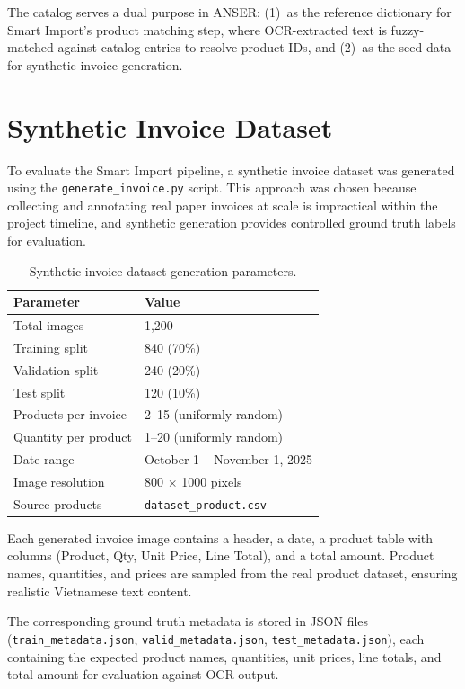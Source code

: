 \documentclass[11pt,a4paper]{report}
\begin{document}
The catalog serves a dual purpose in ANSER: (1)~as the reference dictionary for Smart Import's product matching step, where OCR-extracted text is fuzzy-matched against catalog entries to resolve product IDs, and (2)~as the seed data for synthetic invoice generation.

\section{Synthetic Invoice Dataset}

To evaluate the Smart Import pipeline, a synthetic invoice dataset was generated using the \texttt{generate\_invoice.py} script. This approach was chosen because collecting and annotating real paper invoices at scale is impractical within the project timeline, and synthetic generation provides controlled ground truth labels for evaluation.

\begin{table}[H]
\centering
\caption{Synthetic invoice dataset generation parameters.}
\label{tab:dataset-params}
\small
\begin{tabular}{ll}
\toprule
\textbf{Parameter} & \textbf{Value} \\
\midrule
Total images          & 1,200 \\
Training split        & 840 (70\%) \\
Validation split      & 240 (20\%) \\
Test split            & 120 (10\%) \\
Products per invoice  & 2--15 (uniformly random) \\
Quantity per product  & 1--20 (uniformly random) \\
Date range            & October 1 -- November 1, 2025 \\
Image resolution      & 800 $\times$ 1000 pixels \\
Source products       & \texttt{dataset\_product.csv} \\
\bottomrule
\end{tabular}
\end{table}

Each generated invoice image contains a header, a date, a product table with columns (Product, Qty, Unit Price, Line Total), and a total amount. Product names, quantities, and prices are sampled from the real product dataset, ensuring realistic Vietnamese text content.

The corresponding ground truth metadata is stored in JSON files (\texttt{train\_metadata.json}, \texttt{valid\_metadata.json}, \texttt{test\_metadata.json}), each containing the expected product names, quantities, unit prices, line totals, and total amount for evaluation against OCR output.
\end{document}
